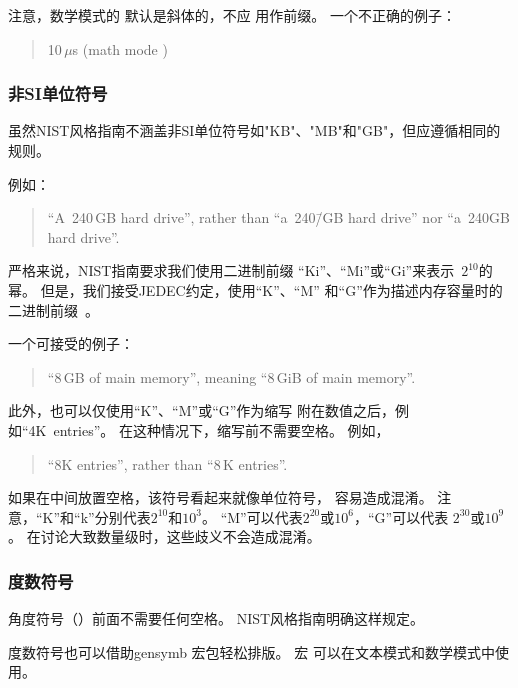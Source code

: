 注意，数学模式的 \qco{\\mu} 默认是斜体的，不应
用作前缀。
一个不正确的例子：
\begin{quote}
  10\,$\mu $s (math mode \qco{\\mu})
\end{quote}

\subsubsection{非SI单位符号}
\label{sec:app:styleguide:Non-SI Unit Symbol}

虽然NIST风格指南不涵盖非SI单位符号如"KB"、"MB"和"GB"，但应遵循相同的规则。

例如：

\begin{quote}
  ``A~240\,GB hard drive'', rather than ``a~240\=/GB hard drive''
  nor ``a~240GB hard drive''.
\end{quote}

严格来说，NIST指南要求我们使用二进制前缀
``Ki''、``Mi''或``Gi''来表示~$2^{10}$的幂。
但是，我们接受JEDEC约定，使用``K''、``M''
和``G''作为描述内存容量时的二进制前缀~\cite{JEDEC:dict:prefixmega}。

一个可接受的例子：
\begin{quote}
  ``8\,GB of main memory'', meaning ``8\,GiB of main memory''.
\end{quote}

此外，也可以仅使用``K''、``M''或``G''作为缩写
附在数值之后，例如``4K~entries''。
在这种情况下，缩写前不需要空格。
例如，

\begin{quote}
  ``8K entries'', rather than ``8\,K entries''.
\end{quote}

如果在中间放置空格，该符号看起来就像单位符号，
容易造成混淆。
注意，``K''和``k''分别代表$2^{10}$和$10^3$。
``M''可以代表$2^{20}$或$10^6$，``G''可以代表
$2^{30}$或$10^9$。
在讨论大致数量级时，这些歧义不会造成混淆。

\subsubsection{度数符号}
\label{sec:app:styleguide:Degree Symbol}

角度符号（\degree）前面不需要任何空格。
NIST风格指南明确这样规定。

度数符号也可以借助gensymb
宏包轻松排版。
宏 \qco{\\degree} 可以在文本模式和数学模式中使用。

